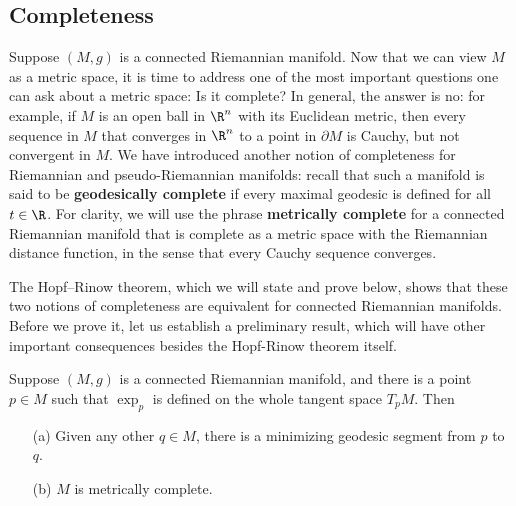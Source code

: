 \subsection{Completeness}
Suppose $(M,g)$ is a connected Riemannian manifold. Now that we can view $M$ as a metric space, it is time to address one of the most important questions one can ask 
about a metric space: Is it complete? In general, the answer is no: for example, if $M$ is an open ball in $\R^n$ with its Euclidean metric, then every sequence in $M$ 
that converges in $\R^n$ to a point in $\partial M$ is Cauchy, but not convergent in $M$. We have introduced another notion of completeness for Riemannian and 
pseudo-Riemannian manifolds: recall that such a manifold is said to be \textbf{geodesically complete} if every maximal geodesic is defined for all $t\in\R$. For 
clarity, we will use the phrase \textbf{metrically complete} for a connected Riemannian manifold that is complete as a metric space with the Riemannian distance 
function, in the sense that every Cauchy sequence converges.\par
The Hopf–Rinow theorem, which we will state and prove below, shows that these two notions of completeness are equivalent for connected Riemannian manifolds. Before we 
prove it, let us establish a preliminary result, which will have other important consequences besides the Hopf-Rinow theorem itself.
\begin{lemma}\label{Riemann hopf-rinow lem}
Suppose $(M,g)$ is a connected Riemannian manifold, and there is a point $p\in M$ such that $\exp_p$ is defined on the whole tangent space $T_pM$. Then
\begin{itemize}
\item[(a)] Given any other $q\in M$, there is a minimizing geodesic segment from $p$ to $q$.
\item[(b)] $M$ is metrically complete.
\end{itemize}
\end{lemma}

